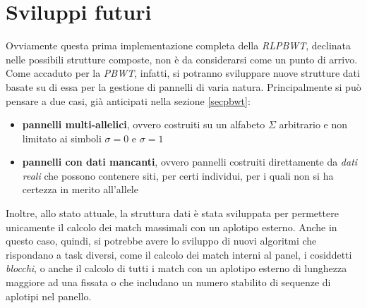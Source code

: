 \section{Sviluppi futuri}
Ovviamente questa prima implementazione completa della \textit{RLPBWT},
declinata nelle possibili strutture composte, non è da
considerarsi come un punto di arrivo. Come accaduto per la \textit{PBWT},
infatti, si potranno sviluppare nuove strutture dati basate su di essa per la
gestione di pannelli di varia natura. Principalmente si può pensare a due casi,
già anticipati nella sezione \ref{secpbwt}:
\begin{itemize}
  \item \textbf{pannelli multi-allelici}, ovvero costruiti su un alfabeto
  $\Sigma$ arbitrario e non limitato ai simboli $\sigma=0$ e $\sigma=1$
  \item \textbf{pannelli con dati mancanti}, ovvero pannelli costruiti
  direttamente da \textit{dati reali} che possono contenere siti, per certi
  individui, per i quali non si ha certezza in merito all'allele
\end{itemize}
Inoltre, allo stato attuale, la struttura dati è stata sviluppata per permettere
unicamente il calcolo dei match massimali con un aplotipo esterno. Anche in
questo caso, quindi, si potrebbe avere lo sviluppo di nuovi algoritmi che
rispondano a task diversi, come il calcolo dei match interni al panel, i
cosiddetti \textit{blocchi}, o anche il calcolo di tutti i match con un aplotipo
esterno di lunghezza maggiore ad una fissata o che includano un numero stabilito
di sequenze di aplotipi nel panello.
